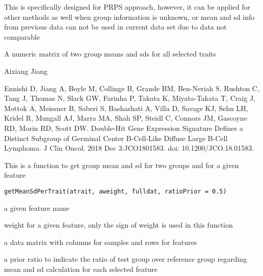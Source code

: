 \documentclass[letterpaper]{book}
\begin{document}
%
\begin{Details}\relax
This is specifically designed for PRPS approach, however, it can be applied for other methods as well when 
group information is unknown, or mean and sd info from previous data can not be used in current data set 
due to data not comparable
\end{Details}
%
\begin{Value}
A numeric matrix of two group means and sds for all selected traits
\end{Value}
%
\begin{Author}\relax
Aixiang Jiang
\end{Author}
%
\begin{References}\relax
Ennishi D, Jiang A, Boyle M, Collinge B, Grande BM, Ben-Neriah S, Rushton C, Tang J, Thomas N, Slack GW, Farinha P,
Takata K, Miyata-Takata T, Craig J, Mottok A, Meissner B, Saberi S, Bashashati A, Villa D, Savage KJ, Sehn LH, 
Kridel R, Mungall AJ, Marra MA, Shah SP, Steidl C, Connors JM, Gascoyne RD, Morin RD, Scott DW. 
Double-Hit Gene Expression Signature Defines a Distinct Subgroup of Germinal Center B-Cell-Like Diffuse Large B-Cell Lymphoma.
J Clin Oncol. 2018 Dec 3:JCO1801583. doi: 10.1200/JCO.18.01583.
\end{References}
%
\begin{Description}\relax
This is a function to get group mean and sd for two groups and for a given feature
\end{Description}
%
\begin{Usage}
\begin{verbatim}
getMeanSdPerTrait(atrait, aweight, fulldat, ratioPrior = 0.5)
\end{verbatim}
\end{Usage}
%
\begin{Arguments}
\begin{ldescription}
\item[\code{atrait}] a given feature name

\item[\code{aweight}] weight for a given feature, only the sign of weight is used in this function

\item[\code{fulldat}] a data matrix with columns for samples and rows for features

\item[\code{ratioPrior}] a prior ratio to indicate the ratio of test group over reference group 
regarding mean and sd calculation for each selected feature
\end{ldescription}
\end{Arguments}
\end{document}
